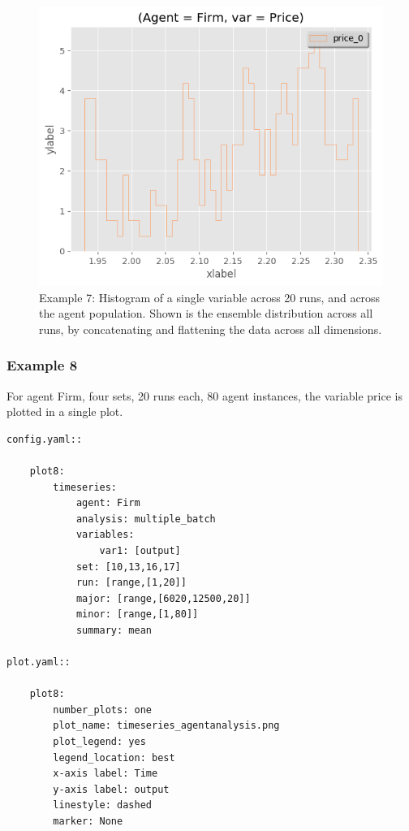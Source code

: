 \documentclass[10pt,a4paper]{article}
\begin{document}
\begin{figure}[b!]\centering\leavevmode
\includegraphics[scale=.6]{./plots_tut_2/one_set_multiple_runs_hg_price_price.png}
\caption{\footnotesize  Example 7: Histogram of a single variable across 20 runs, and across the agent population. Shown is the ensemble distribution across all runs, by concatenating and flattening the data across all dimensions.}
\end{figure}


\clearpage
\subsubsection{Example 8}
For agent Firm, four sets, 20 runs each, 80 agent instances, the variable price is plotted in a single plot.

\begin{lstlisting}
config.yaml::

    plot8:
        timeseries:
            agent: Firm
            analysis: multiple_batch
            variables:
                var1: [output]
            set: [10,13,16,17]
            run: [range,[1,20]]
            major: [range,[6020,12500,20]]
            minor: [range,[1,80]] 
            summary: mean

plot.yaml::

    plot8:
        number_plots: one
        plot_name: timeseries_agentanalysis.png
        plot_legend: yes
        legend_location: best
        x-axis label: Time
        y-axis label: output
        linestyle: dashed
        marker: None
\end{lstlisting}
\end{document}
